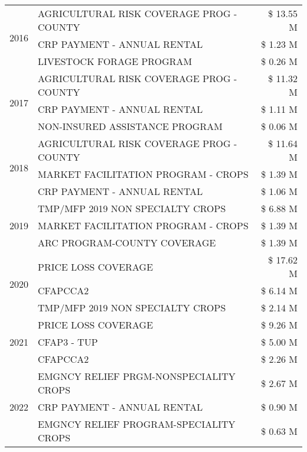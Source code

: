 \begin{tabular}{llr}
\cline{1-3}
\multirow[t]{3}{*}{2016} & AGRICULTURAL RISK COVERAGE PROG - COUNTY & \$ 13.55 M \\
 & CRP PAYMENT - ANNUAL RENTAL & \$ 1.23 M \\
 & LIVESTOCK FORAGE PROGRAM & \$ 0.26 M \\
\cline{1-3}
\multirow[t]{3}{*}{2017} & AGRICULTURAL RISK COVERAGE PROG - COUNTY & \$ 11.32 M \\
 & CRP PAYMENT - ANNUAL RENTAL & \$ 1.11 M \\
 & NON-INSURED ASSISTANCE PROGRAM & \$ 0.06 M \\
\cline{1-3}
\multirow[t]{3}{*}{2018} & AGRICULTURAL RISK COVERAGE PROG - COUNTY & \$ 11.64 M \\
 & MARKET FACILITATION PROGRAM - CROPS & \$ 1.39 M \\
 & CRP PAYMENT - ANNUAL RENTAL & \$ 1.06 M \\
\cline{1-3}
\multirow[t]{3}{*}{2019} & TMP/MFP 2019 NON SPECIALTY CROPS & \$ 6.88 M \\
 & MARKET FACILITATION PROGRAM - CROPS & \$ 1.39 M \\
 & ARC PROGRAM-COUNTY COVERAGE & \$ 1.39 M \\
\cline{1-3}
\multirow[t]{3}{*}{2020} & PRICE LOSS COVERAGE & \$ 17.62 M \\
 & CFAPCCA2 & \$ 6.14 M \\
 & TMP/MFP 2019 NON SPECIALTY CROPS & \$ 2.14 M \\
\cline{1-3}
\multirow[t]{3}{*}{2021} & PRICE LOSS COVERAGE & \$ 9.26 M \\
 & CFAP3 - TUP & \$ 5.00 M \\
 & CFAPCCA2 & \$ 2.26 M \\
\cline{1-3}
\multirow[t]{3}{*}{2022} & EMGNCY RELIEF PRGM-NONSPECIALITY CROPS & \$ 2.67 M \\
 & CRP PAYMENT - ANNUAL RENTAL & \$ 0.90 M \\
 & EMGNCY RELIEF PROGRAM-SPECIALITY CROPS & \$ 0.63 M \\
\cline{1-3}
\bottomrule
\end{tabular}
